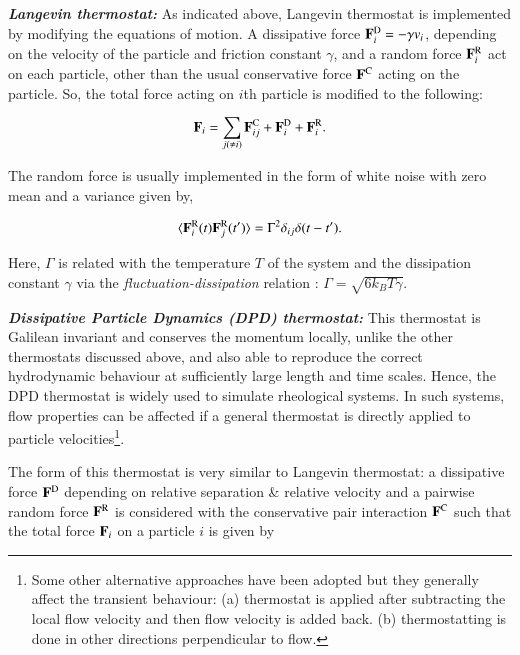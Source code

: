     {\bf \em Langevin thermostat:} As indicated above, Langevin thermostat \cite{frenkel2001understanding,allen2017} is implemented by modifying the equations of motion. A dissipative force ${\bf F}^{\rm D}_i = - \gamma v_i $, depending on the velocity of the particle and friction constant $\gamma$, and a random force ${\bf F}^{\rm R}_i$ act on each particle, other than the usual conservative force ${\bf F}^{\rm C}$ acting on the particle. So, the total force acting on $i$th particle is modified to the following:
    
    \begin{equation}
        {\bf F}_i = \sum_{j(\neq i)} {\bf F}^{\rm C}_{ij} + {\bf F}^{\rm D}_{i} + {\bf F}^{\rm R}_{i} .
    \end{equation}
    
    The random force is usually implemented in the form of white noise with zero mean and a variance given by,
    
    \begin{equation}
        \langle {\bf F}^{\rm R}_{i} (t)  {\bf F}^{\rm R}_{j} (t') \rangle = \Gamma^2 \delta_{ij}\delta(t-t').
    \end{equation}
    
    Here, $\Gamma$ is related with the temperature $T$ of the system and the dissipation constant $\gamma$ via the {\em fluctuation-dissipation} relation \cite{van1992stochastic}: $\Gamma = \sqrt{6k_BT\gamma}$. 
    
    {\bf \em Dissipative Particle Dynamics {\rm (DPD)} thermostat:} This thermostat \cite{dpd} is Galilean invariant and conserves the momentum locally, unlike the other thermostats discussed above, and also able to reproduce the correct hydrodynamic behaviour at sufficiently large length and time scales. Hence, the DPD thermostat is widely used to simulate rheological systems. In such systems, flow properties can be affected if a general thermostat is directly applied to particle velocities\footnote{Some other alternative approaches have been adopted but they generally affect the transient behaviour: (a) thermostat is applied after subtracting the local flow velocity and then flow velocity is added back. (b) thermostatting is done in other directions perpendicular to flow.}.
    
    The form of this thermostat is very similar to Langevin thermostat: a dissipative force ${\bf F}^{\rm D}$ depending on relative separation \& relative velocity and a pairwise random force ${\bf F}^{\rm R}$ is considered with the conservative pair interaction ${\bf F}^{\rm C}$ such that the total force ${\bf F}_i$ on a particle $i$ is given by
    
